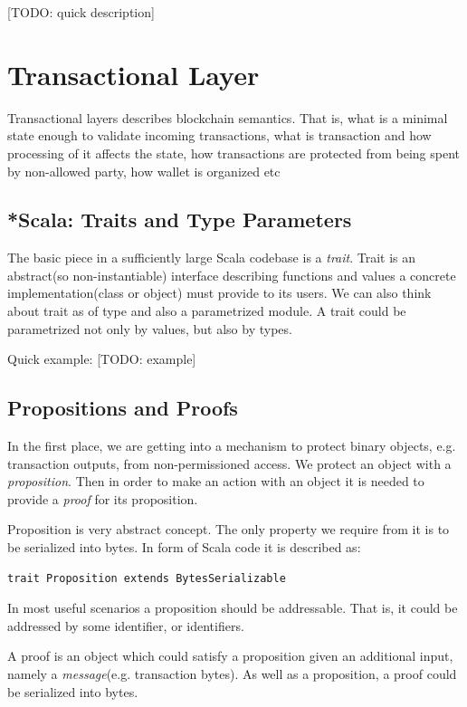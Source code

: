 \documentclass[]{report}   %
\begin{document}
[TODO: quick description]

\section{Transactional Layer}

Transactional layers describes blockchain semantics. That is, what is a minimal state enough to validate incoming transactions, what is transaction and how processing of it affects the state, how transactions are protected from being spent by non-allowed party, how wallet is organized etc

\subsection{*Scala: Traits and Type Parameters}

The basic piece in a sufficiently large Scala codebase is a \textit{trait}. Trait is an abstract(so non-instantiable) interface describing functions and values a concrete implementation(class or object) must provide to its users. We can also think about trait as of type and also a parametrized module. A trait could be parametrized not only by values, but also by types. 

Quick example: 
[TODO: example]

\subsection{Propositions and Proofs}

In the first place, we are getting into a mechanism to protect binary objects, e.g. transaction outputs, from non-permissioned access. We protect an object with a \textit{proposition}. Then in order to make an action with an object it is needed to provide a \textit{proof} for its proposition. 

Proposition is very abstract concept. The only property we require from it is to be serialized into bytes. In form of Scala code it is described as:

\begin{lstlisting}
trait Proposition extends BytesSerializable
\end{lstlisting}

In most useful scenarios a proposition should be addressable. That is, it could be addressed by some identifier, or identifiers.

A proof is an object which could satisfy a proposition given an additional input, namely a \textit{message}(e.g. transaction bytes). As well as a proposition, a proof could be serialized into bytes. 
\end{document}
